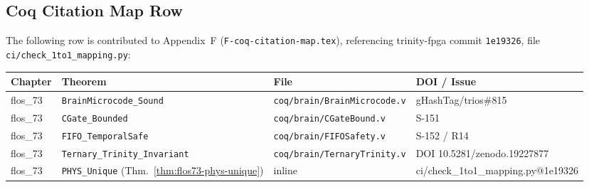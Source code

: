 

\subsection{Coq Citation Map Row}
\label{ssec:flos73-coq-map}

The following row is contributed to Appendix~F
(\texttt{F-coq-citation-map.tex}), referencing
trinity-fpga commit \texttt{1e19326},
file \texttt{ci/check\_1to1\_mapping.py}:

\begin{center}
\small
\begin{tabular}{llll}
\toprule
Chapter & Theorem & File & DOI / Issue \\
\midrule
flos\_73 & \texttt{BrainMicrocode\_Sound}       & \texttt{coq/brain/BrainMicrocode.v}    & gHashTag/trios\#815 \\
flos\_73 & \texttt{CGate\_Bounded}              & \texttt{coq/brain/CGateBound.v}         & S-151 \\
flos\_73 & \texttt{FIFO\_TemporalSafe}          & \texttt{coq/brain/FIFOSafety.v}         & S-152 / R14 \\
flos\_73 & \texttt{Ternary\_Trinity\_Invariant} & \texttt{coq/brain/TernaryTrinity.v}     & DOI 10.5281/zenodo.19227877 \\
flos\_73 & \texttt{PHYS\_Unique} (Thm.~\ref{thm:flos73-phys-unique}) & inline & ci/check\_1to1\_mapping.py@1e19326 \\
\bottomrule
\end{tabular}
\end{center}





